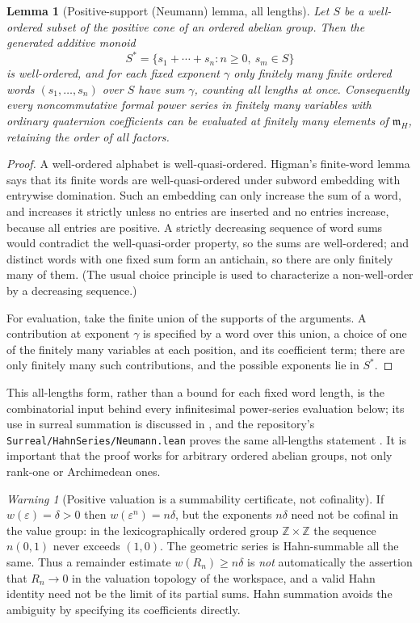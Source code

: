 \documentclass[11pt,letterpaper]{article}
\numberwithin{equation}{section}
\newtheorem{lemma}[lemma]{Lemma}
\theoremstyle{definition}
\theoremstyle{remark}
\newtheorem{warning}[warning]{Warning}
\newcommand{\Z}{\mathbb Z}
\newcommand{\mm}{\mathfrak m}
\newcommand{\eps}{\varepsilon}
\begin{document}
\begin{lemma}[Positive-support (Neumann) lemma, all lengths]\label{squat:lem:neumann}
Let $S$ be a well-ordered subset of the positive cone of an ordered abelian group. Then
the generated additive monoid
\[
 S^*=\{s_1+\cdots+s_n:n\ge0,\ s_m\in S\}
\]
is well-ordered, and for each fixed exponent $\gamma$ only finitely many finite ordered
words $(s_1,\ldots,s_n)$ over $S$ have sum $\gamma$, counting \emph{all lengths at once}.
Consequently every noncommutative formal power series in finitely many variables with
ordinary quaternion coefficients can be evaluated at finitely many elements of $\mm_H$,
retaining the order of all factors.
\end{lemma}
\begin{proof}
A well-ordered alphabet is well-quasi-ordered. Higman's finite-word lemma says that its
finite words are well-quasi-ordered under subword embedding with entrywise domination.
Such an embedding can only increase the sum of a word, and increases it strictly unless no
entries are inserted and no entries increase, because all entries are positive. A strictly
decreasing sequence of word sums would contradict the well-quasi-order property, so the
sums are well-ordered; and distinct words with one fixed sum form an antichain, so there
are only finitely many of them. (The usual choice principle is used to characterize a
non-well-order by a decreasing sequence.)

For evaluation, take the finite union of the supports of the arguments. A contribution at
exponent $\gamma$ is specified by a word over this union, a choice of one of the finitely
many variables at each position, and its coefficient term; there are only finitely many
such contributions, and the possible exponents lie in $S^*$.
\end{proof}

This all-lengths form, rather than a bound for each fixed word length, is the
combinatorial input behind every infinitesimal power-series evaluation below; its use in
surreal summation is discussed in \cite{BM}, and the repository's
\texttt{Surreal/HahnSeries/Neumann.lean} proves the same all-lengths statement
\cite{Repo}. It is important that the proof works for arbitrary ordered abelian groups,
not only rank-one or Archimedean ones.

\begin{warning}[Positive valuation is a summability certificate, not cofinality]
\label{squat:warn:cofinality}
If $w(\eps)=\delta>0$ then $w(\eps^n)=n\delta$, but the exponents $n\delta$ need not be
cofinal in the value group: in the lexicographically ordered group $\Z\times\Z$ the
sequence $n(0,1)$ never exceeds $(1,0)$. The geometric series is Hahn-summable all the
same. Thus a remainder estimate $w(R_n)\ge n\delta$ is \emph{not} automatically the
assertion that $R_n\to0$ in the valuation topology of the workspace, and a valid Hahn
identity need not be the limit of its partial sums. Hahn summation avoids the ambiguity by
specifying its coefficients directly.
\end{warning}
\end{document}
